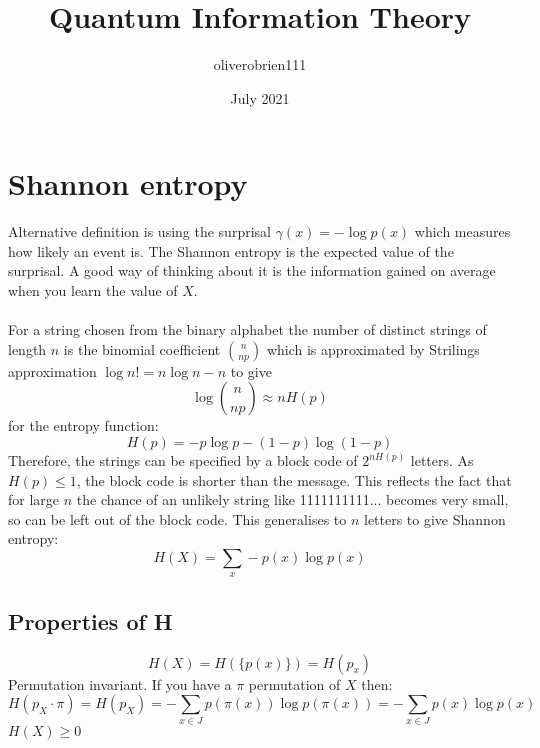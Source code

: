 \documentclass{article}
\title{Quantum Information Theory}
\author{oliverobrien111 }
\date{July 2021}
\begin{document}
\maketitle

\section{Shannon entropy}
Alternative definition is using the surprisal $\gamma(x) = -\log p(x)$ which measures how likely an event is. The Shannon entropy is the expected value of the surprisal. A good way of thinking about it is the information gained on average when you learn the value of $X$.\\\\
For a string chosen from the binary alphabet the number of distinct strings of length $n$ is the binomial coefficient ${n \choose np}$ which is approximated by Strilings approximation $\log n! = n\log n - n$ to give
$$
\log {n \choose np} \approx nH(p)
$$
for the entropy function:
\begin{equation}
    H(p) = -p\log p - (1-p) \log (1-p)
\end{equation}
Therefore, the strings can be specified by a block code of $2^{nH(p)}$ letters. As $H(p) \leq 1$, the block code is shorter than the message. This reflects the fact that for large $n$ the chance of an unlikely string like 1111111111... becomes very small, so can be left out of the block code. This generalises to $n$ letters to give Shannon entropy:
\begin{equation}
    H(X) = \sum_x -p(x)\log p(x)
\end{equation}
\subsection{Properties of H}
$$
H(X) = H(\{p(x)\}) = H(p_x)
$$
Permutation invariant. If you have a $\pi$ permutation of $X$ then:
$$
H(p_X \cdot \pi) = H(p_X)
= -\sum_{x\in J} p(\pi(x))\log p(\pi(x)) = -\sum_{x\in J} p(x) \log p(x)
$$
$H(X) \geq 0$
\end{document}
